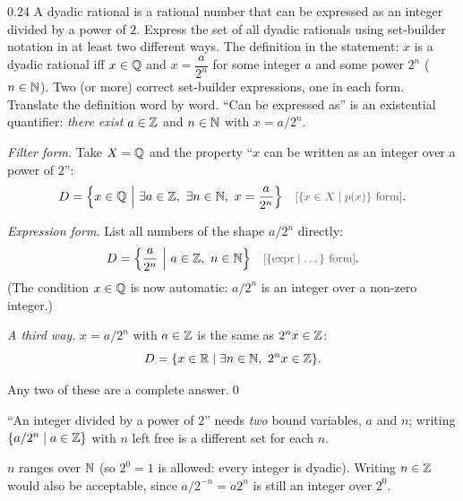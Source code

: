\begin{bookex}[essential]{0.24}
A dyadic rational is a rational number that can be expressed as an integer divided by a power of $2$. Express the set of all dyadic rationals using set-builder notation in at least two different ways.
\solution
\given The definition in the statement: $x$ is a dyadic rational iff $x\in\mathbb{Q}$ and $x=\dfrac a{2^n}$ for some integer $a$ and some power $2^n$ ($n\in\mathbb{N}$).
\goal Two (or more) correct set-builder expressions, one in each form.
\plan Translate the definition word by word. ``Can be expressed as'' is an existential quantifier: \emph{there exist} $a\in\mathbb{Z}$ and $n\in\mathbb{N}$ with $x=a/2^n$.
\begin{steps}
\item \emph{Filter form.} Take $X=\mathbb{Q}$ and the property ``$x$ can be written as an integer over a power of $2$'':
\[
D=\Big\{x\in\Q\ \Big|\ \exists a\in\Z,\ \exists n\in\N,\ x=\frac a{2^n}\Big\} \why{$\{x\in X\mid p(x)\}$ form}.
\]
\item \emph{Expression form.} List all numbers of the shape $a/2^n$ directly:
\[
D=\Big\{\frac a{2^n}\ \Big|\ a\in\Z,\ n\in\N\Big\} \why{$\{\mathrm{expr}\mid\dots\}$ form}.
\]
(The condition $x\in\mathbb{Q}$ is now automatic: $a/2^n$ is an integer over a non-zero integer.)
\item \emph{A third way.} $x=a/2^n$ with $a\in\mathbb{Z}$ is the same as $2^nx\in\mathbb{Z}$:
\[
D=\{x\in\R\mid\exists n\in\N,\ 2^nx\in\Z\}.
\]
\end{steps}
\conclusion Any two of these are a complete answer.\qed
\begin{compare}
\item ``An integer divided by a power of $2$'' needs \emph{two} bound variables, $a$ and $n$; writing $\{a/2^n\mid a\in\mathbb{Z}\}$ with $n$ left free is a different set for each $n$.
\item $n$ ranges over $\mathbb{N}$ (so $2^0=1$ is allowed: every integer is dyadic). Writing $n\in\mathbb{Z}$ would also be acceptable, since $a/2^{-n}=a2^n$ is still an integer over $2^0$.
\end{compare}
\end{bookex}

